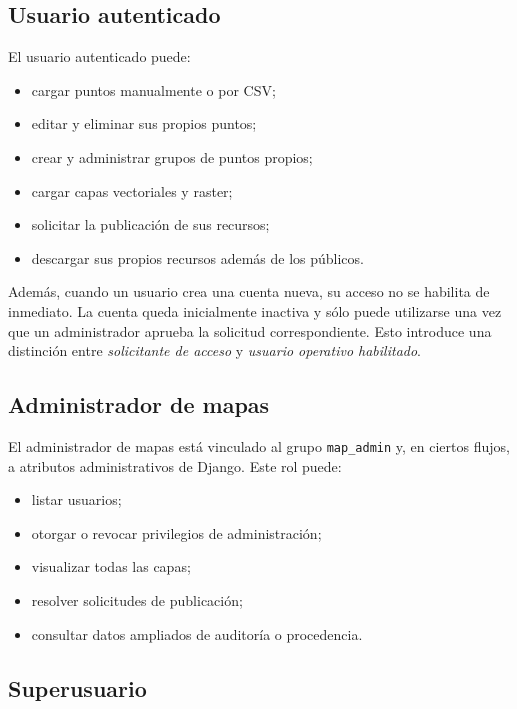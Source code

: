 \documentclass[12pt,a4paper]{report}
\begin{document}
\subsection{Usuario autenticado}

El usuario autenticado puede:

\begin{itemize}
    \item cargar puntos manualmente o por CSV;
    \item editar y eliminar sus propios puntos;
    \item crear y administrar grupos de puntos propios;
    \item cargar capas vectoriales y raster;
    \item solicitar la publicaci\'on de sus recursos;
    \item descargar sus propios recursos adem\'as de los p\'ublicos.
\end{itemize}

Adem\'as, cuando un usuario crea una cuenta nueva, su acceso no se habilita de inmediato. La cuenta queda inicialmente inactiva y s\'olo puede utilizarse una vez que un administrador aprueba la solicitud correspondiente. Esto introduce una distinci\'on entre \emph{solicitante de acceso} y \emph{usuario operativo habilitado}.

\subsection{Administrador de mapas}

El administrador de mapas est\'a vinculado al grupo \texttt{map\_admin} y, en ciertos flujos, a atributos administrativos de Django. Este rol puede:

\begin{itemize}
    \item listar usuarios;
    \item otorgar o revocar privilegios de administraci\'on;
    \item visualizar todas las capas;
    \item resolver solicitudes de publicaci\'on;
    \item consultar datos ampliados de auditor\'ia o procedencia.
\end{itemize}

\subsection{Superusuario}
\end{document}
